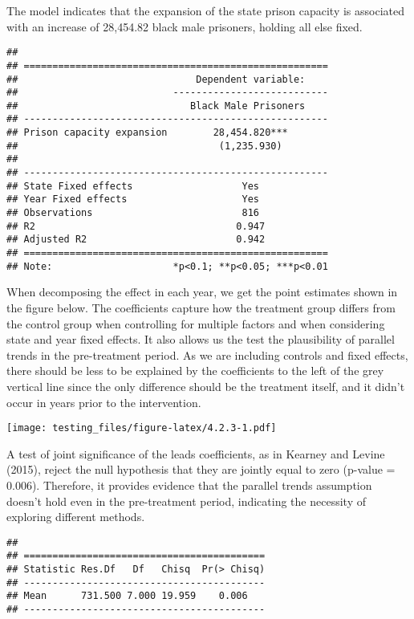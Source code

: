 \documentclass[
]{article}
\begin{document}
The model indicates that the expansion of the state prison capacity is
associated with an increase of 28,454.82 black male prisoners, holding
all else fixed.

\begin{verbatim}
## 
## =====================================================
##                               Dependent variable:    
##                           ---------------------------
##                              Black Male Prisoners    
## -----------------------------------------------------
## Prison capacity expansion        28,454.820***       
##                                   (1,235.930)        
##                                                      
## -----------------------------------------------------
## State Fixed effects                   Yes            
## Year Fixed effects                    Yes            
## Observations                          816            
## R2                                   0.947           
## Adjusted R2                          0.942           
## =====================================================
## Note:                     *p<0.1; **p<0.05; ***p<0.01
\end{verbatim}

When decomposing the effect in each year, we get the point estimates
shown in the figure below. The coefficients capture how the treatment
group differs from the control group when controlling for multiple
factors and when considering state and year fixed effects. It also
allows us the test the plausibility of parallel trends in the
pre-treatment period. As we are including controls and fixed effects,
there should be less to be explained by the coefficients to the left of
the grey vertical line since the only difference should be the treatment
itself, and it didn't occur in years prior to the intervention.

\texttt{[image: testing\_files/figure-latex/4.2.3-1.pdf]}

A test of joint significance of the leads coefficients, as in Kearney
and Levine (2015), reject the null hypothesis that they are jointly
equal to zero (p-value = 0.006). Therefore, it provides evidence that
the parallel trends assumption doesn't hold even in the pre-treatment
period, indicating the necessity of exploring different methods.

\begin{verbatim}
## 
## ==========================================
## Statistic Res.Df   Df   Chisq  Pr(> Chisq)
## ------------------------------------------
## Mean      731.500 7.000 19.959    0.006   
## ------------------------------------------
\end{verbatim}
\end{document}
